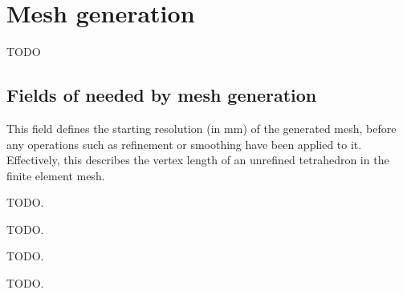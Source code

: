 \section{Mesh generation}\label{sec:mesh-generation}

TODO


\subsection{Fields of  needed by mesh generation}%
\label{ssec:meshing-fields}

 This field defines the starting resolution
(in \si{\milli\meter}) of the generated mesh, before any operations such as
refinement or smoothing have been applied to it. Effectively, this describes
the vertex length of an unrefined tetrahedron in the finite element mesh.

 TODO.

 TODO.

 TODO.

 TODO.
